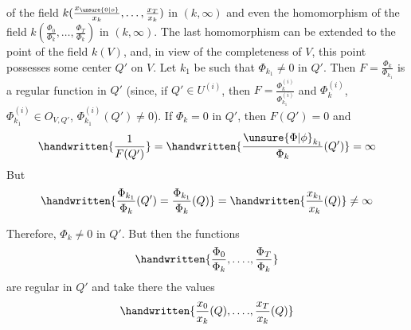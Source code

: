 of the field $k(\frac{x_{\unsure{0|o}}}{x_k},\ldots,\frac{x_T}{x_k})$ in $(k,\infty)$ and even the
homomorphism of the field $k(\frac{\Phi_0}{\Phi_k},\ldots,\frac{\Phi_T}{\Phi_k})$ in $(k,\infty)$. The
last homomorphism can be extended to the point of the
field $k(V)$, and, in view of the completeness of $V$,
this\unsure{,} point possesses some center $Q'$ on $V$. Let $k_1$
be such that $\Phi_{k_1}\ne0$ in $Q'$. Then $F=\frac{\Phi_k}{\Phi_{k_1}}$ is a
regular function in $Q'$
(since, if $Q'\in U^{(i)}$, then $F=\frac{\Phi_k^{(i)}}{\Phi_{k_1}^{(i)}}$ and $\Phi_k^{(i)}$,
$\Phi_{k_1}^{(i)}\in O_{V,Q'}$, $\Phi_{k_1}^{(i)}(Q')\ne0$). If $\Phi_k=0$ in $Q'$,
then $F(Q')=0$ and
\[
\handwritten{\frac{1}{F(Q')}}=\handwritten{\frac{\unsure{\Phi|\phi}_{k_1}}{\Phi_k}(Q')}=\infty
\]
But
\[
\handwritten{\frac{\Phi_{k_1}}{\Phi_k}(Q')=\frac{\Phi_{k_1}}{\Phi_k}(Q)}=\handwritten{\frac{x_{k_1}}{x_k}(Q)}\ne\infty
\]

Therefore, $\Phi_k\ne0$ in $Q'$. But then the functions
\[
\handwritten{\frac{\Phi_0}{\Phi_k},\ldots\mathord{.},\frac{\Phi_T}{\Phi_k}}
\]
are regular in $Q'$ and take there the values
\[
\handwritten{\frac{x_0}{x_k}(Q),\ldots\mathord{.},\frac{x_T}{x_k}(Q)}
\]
